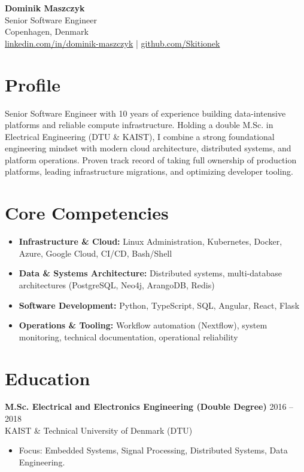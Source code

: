 \documentclass[11pt,a4paper]{article}
\begin{document}
\begin{center}
    {\LARGE \textbf{Dominik Maszczyk}} \\[4pt]
    \textcolor{accent}{Senior Software Engineer} \\[6pt]
    Copenhagen, Denmark \\
    \href{https://www.linkedin.com/in/dominik-maszczyk/}{linkedin.com/in/dominik-maszczyk} \quad | \quad
    \href{https://github.com/Skitionek}{github.com/Skitionek}
\end{center}

\vspace{6pt}

\section{Profile}
Senior Software Engineer with 10 years of experience building data-intensive platforms and reliable compute infrastructure. Holding a double M.Sc. in Electrical Engineering (DTU \& KAIST), I combine a strong foundational engineering mindset with modern cloud architecture, distributed systems, and platform operations. Proven track record of taking full ownership of production platforms, leading infrastructure migrations, and optimizing developer tooling.

\section{Core Competencies}
\begin{itemize}
    \item \textbf{Infrastructure \& Cloud:} Linux Administration, Kubernetes, Docker, Azure, Google Cloud, CI/CD, Bash/Shell
    \item \textbf{Data \& Systems Architecture:} Distributed systems, multi-database architectures (PostgreSQL, Neo4j, ArangoDB, Redis)
    \item \textbf{Software Development:} Python, TypeScript, SQL, Angular, React, Flask
    \item \textbf{Operations \& Tooling:} Workflow automation (Nextflow), system monitoring, technical documentation, operational reliability
\end{itemize}

\section{Education}
\textbf{M.Sc. Electrical and Electronics Engineering (Double Degree)} \hfill 2016 -- 2018 \\
KAIST \& Technical University of Denmark (DTU)
\begin{itemize}
    \small \item Focus: Embedded Systems, Signal Processing, Distributed Systems, Data Engineering.
\end{itemize}
\end{document}
